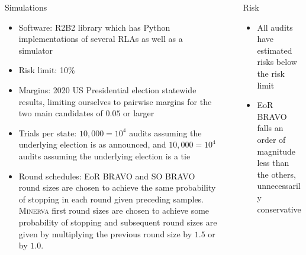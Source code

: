 \documentclass[final]{beamer}
\newcommand{\Minerva}{\textsc{Minerva}\xspace}
\newcommand{\BRAVO}{\textsc{BRAVO}\xspace}
\newlength{\sepwidth}
\newlength{\colwidth}
\newcommand{\separatorcolumn}{\begin{column}{\sepwidth}\end{column}}
\begin{document}
\begin{frame}[t]
\begin{columns}[t]
\begin{column}{\colwidth}
\begin{block}{Simulations}
\begin{itemize}
\item 
Software: R2B2 library\cite{r2b2} which has Python implementations of several RLAs as well as a simulator
\item 
Risk limit: 10\%
\item
Margins: 2020 US Presidential election statewide results, limiting ourselves to pairwise margins
for the two main candidates of $0.05$ or larger
\item 
Trials per state: $10,000=10^4$ audits assuming the underlying election is as announced,  
and $10,000=10^4$ audits assuming the underlying election is a tie
\item 
Round schedules: EoR \BRAVO and SO \BRAVO round sizes are chosen to achieve the same
probability of stopping in each round given preceding samples. \Minerva first round sizes
are chosen to achieve some probability of stopping and subsequent round sizes are given by multiplying the previous
round size by $1.5$ or by $1.0$.
\end{itemize}
\end{block}

\end{column}

\separatorcolumn

\begin{column}{\colwidth}

\begin{block}{Risk}

\begin{itemize}
\item 
All audits have estimated risks below the risk limit
\item
EoR \BRAVO falls an order of magnitude less than the others, unnecessarily conservative
\end{itemize}


\end{block}
\end{column}
\end{columns}
\end{frame}
\end{document}
